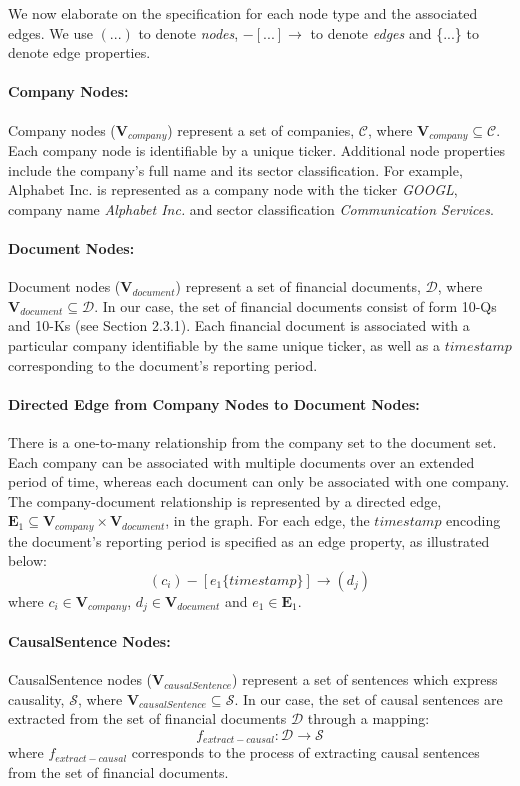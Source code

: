 We now elaborate on the specification for each node type and the associated edges. We use $(...)$ to denote \emph{nodes}, $-[...]\rightarrow$ to denote \emph{edges} and \{...\} to denote edge properties.


\paragraph{Company Nodes:} Company nodes ($\mathbf{V}_{company}$) represent a set of companies, $\mathcal{C}$, where $\mathbf{V}_{company} \subseteq \mathbf{\mathcal{C}}$. Each company node is identifiable by a unique ticker. Additional node properties include the company's full name and its sector classification. For example, Alphabet Inc. is represented as a company node with the ticker \emph{GOOGL}, company name \emph{Alphabet Inc.} and sector classification \emph{Communication Services}.  


\paragraph{Document Nodes:} Document nodes ($\mathbf{V}_{document}$) represent a set of financial documents, $\mathbf{\mathcal{D}}$, where $\mathbf{V}_{document} \subseteq \mathbf{\mathcal{D}}$. In our case, the set of financial documents consist of form 10-Qs and 10-Ks (see Section 2.3.1). Each financial document is associated with a particular company identifiable by the same unique ticker, as well as a $timestamp$ corresponding to the document's reporting period.  


\paragraph{Directed Edge from Company Nodes to Document Nodes:} There is a one-to-many relationship from the company set to the document set. Each company can be associated with multiple documents over an extended period of time, whereas each document can only be associated with one company. The company-document relationship is represented by a directed edge, $\mathbf{E}_1 \subseteq \mathbf{V}_{company} \times \mathbf{V}_{document}$, in the graph. For each edge, the $timestamp$ encoding the document's reporting period is specified as an edge property, as illustrated below:
\[( c_i ) - [ e_1 \{timestamp\} ]\rightarrow ( d_j ) \]
where $c_i \in \mathbf{V}_{company}$,  $d_j \in \mathbf{V}_{document}$ and $e_1 \in \mathbf{E}_1$.


\paragraph{CausalSentence Nodes:} CausalSentence nodes ($\mathbf{V}_{causalSentence}$) represent a set of sentences which express causality, $\mathbf{\mathcal{S}}$, where $\mathbf{V}_{causalSentence} \subseteq \mathcal{S}$. In our case, the set of causal sentences are extracted from the set of financial documents $\mathbf{\mathcal{D}}$ through a mapping: 
\[f_{extract-causal}: \mathbf{\mathcal{D}} \rightarrow \mathbf{\mathcal{S}}\] 
where $f_{extract-causal}$ corresponds to the process of extracting causal sentences from the set of financial documents.

